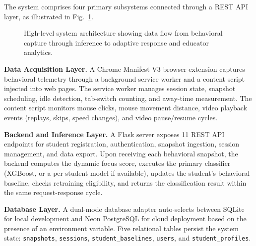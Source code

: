 \documentclass[conference]{IEEEtran}
\begin{document}
The system comprises four primary subsystems connected through a REST API layer, as illustrated in Fig.~\ref{fig:architecture}.

\begin{figure}[h]
\centering
\setlength{\fboxsep}{8pt}
\caption{High-level system architecture showing data flow from behavioral capture through inference to adaptive response and educator analytics.}
\label{fig:architecture}
\end{figure}

\textbf{Data Acquisition Layer.} A Chrome Manifest V3 browser extension captures behavioral telemetry through a background service worker and a content script injected into web pages. The service worker manages session state, snapshot scheduling, idle detection, tab-switch counting, and away-time measurement. The content script monitors mouse clicks, mouse movement distance, video playback events (replays, skips, speed changes), and video pause/resume cycles.

\textbf{Backend and Inference Layer.} A Flask server exposes 11 REST API endpoints for student registration, authentication, snapshot ingestion, session management, and data export. Upon receiving each behavioral snapshot, the backend computes the dynamic focus score, executes the primary classifier (XGBoost, or a per-student model if available), updates the student's behavioral baseline, checks retraining eligibility, and returns the classification result within the same request-response cycle.

\textbf{Database Layer.} A dual-mode database adapter auto-selects between SQLite for local development and Neon PostgreSQL for cloud deployment based on the presence of an environment variable. Five relational tables persist the system state: \texttt{snapshots}, \texttt{sessions}, \texttt{student\_baselines}, \texttt{users}, and \texttt{student\_profiles}.
\end{document}
